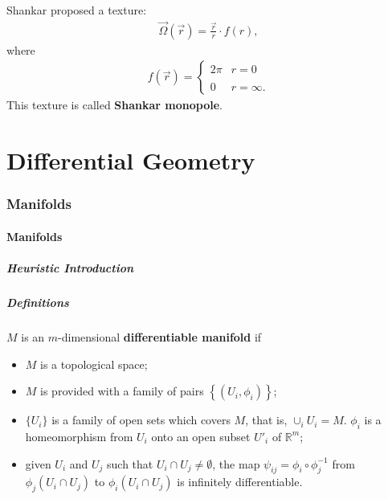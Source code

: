 \documentclass[10pt]{article}
\begin{document}
Shankar proposed a texture:
\begin{align}
    \vec{\Omega}(\vec{r})=\frac{\vec{r}}{r}\cdot f(r),
\end{align}
where
\begin{align}
    f(\vec{r})=\begin{cases}
        2\pi & r=0       \\\\
        0    & r=\infty.
    \end{cases}
\end{align}
This texture is called \textbf{Shankar monopole}.

\clearpage
\part{Differential Geometry}
\section{Manifolds}
\subsection{Manifolds}
\subsubsection{Heuristic Introduction}
\subsubsection{Definitions}
\begin{definition}
    $M$ is an $m$-dimensional \textbf{differentiable manifold} if
    \begin{itemize}
        \item $M$ is a topological space;
        \item $M$ is provided with a family of pairs $\left\{\left(U_i,\phi_i\right)\right\}$;
        \item $\{U_i\}$ is a family of open sets which covers $M$, that is, $\cup_i U_i=M$.
              $\phi_i$ is a homeomorphism from $U_i$ onto an open subset $U'_i$ of $\mathbb{R}^m$;
        \item given $U_i$ and $U_j$ such that $U_i\cap U_j\neq\emptyset$, the map $\psi_{ij}=\phi_i\circ\phi_j^{-1}$ from $\phi_j(U_i\cap U_j)$ to $\phi_i(U_i\cap U_j)$ is infinitely differentiable.
    \end{itemize}
\end{definition}
\end{document}
